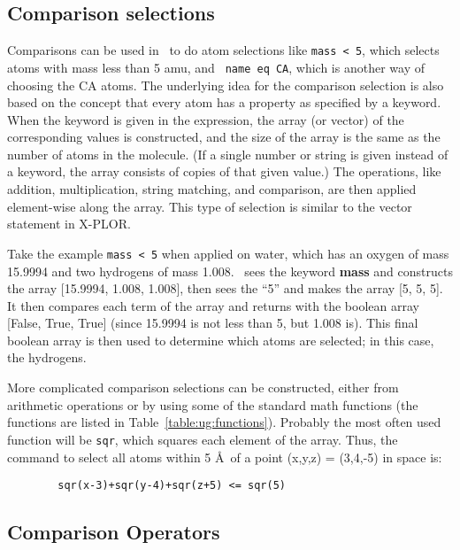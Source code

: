 \subsection{Comparison selections}
\label{ug:topic:selections:comparison}
Comparisons can be used in \VMD\ to do atom selections like {\tt mass
{\tt <} 5}, which selects atoms with mass less than 5 amu, and {\tt
name eq CA}, which is another way of choosing the CA atoms.  The
underlying idea for the comparison selection is also based on the
concept that every atom has a property as specified by a keyword.
When the keyword is given in the expression, the array (or vector) of
the corresponding values is constructed, and the size of the array is
the same as the number of atoms in the molecule.  (If a single number
or string is given instead of a keyword, the array consists of copies
of that given value.)  The operations, like addition, multiplication,
string matching, and comparison, are then applied element-wise along
the array.  This type of selection is similar to the vector statement
in X-PLOR.

Take the example {\tt mass {\tt <} 5} when applied on water, which has
an oxygen of mass 15.9994 and two hydrogens of mass 1.008.  \VMD\ sees
the keyword {\bf mass} and constructs the array [15.9994, 1.008,
1.008], then sees the ``5'' and makes the array [5, 5, 5].  It then
compares each term of the array and returns with the boolean array
[False, True, True] (since 15.9994 is not less than 5, but 1.008 is).
This final boolean array is then used to determine which atoms are
selected; in this case, the hydrogens.

More complicated comparison selections can be constructed, either from
arithmetic operations or by using some of the standard math functions
(the functions are listed in Table~\ref{table:ug:functions}).  
Probably the most often used
function will be {\tt sqr}, which squares each element of the array.
Thus, the command to select all atoms within 5 \AA\ of a point (x,y,z)
= (3,4,-5) in space is:

\begin{verbatim}
        sqr(x-3)+sqr(y-4)+sqr(z+5) <= sqr(5)
\end{verbatim}

\subsection{Comparison Operators}


